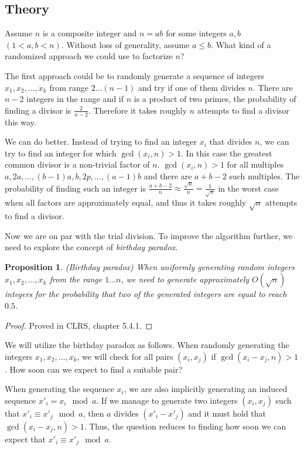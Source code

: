 \documentclass[12pt] {article}
\theoremstyle{plain}
\newtheorem{prop}[thm]{Proposition}
\theoremstyle{definition}
\begin{document}
\subsection {Theory}

Assume $n$ is a composite integer and $n = ab$ for some integers $a, b$ $(1 < a, b < n)$. Without loss of generality, assume $a \leq b$. What kind of a randomized approach we could use to factorize $n$?

The first approach could be to randomly generate a sequence of integers $x_1, x_2, \dots, x_k$ from range $2 \dots (n-1)$ and try if one of them divides $n$. There are $n-2$ integers in the range and if $n$ is a product of two primes, the probability of finding a divisor is $\frac{2}{n-2}$. Therefore it takes roughly $n$ attempts to find a divisor this way.

We can do better. Instead of trying to find an integer $x_i$ that divides $n$, we can try to find an integer for which $\gcd(x_i, n) > 1$. In this case the greatest common divisor is a non-trivial factor of $n$. $\gcd(x_i, n) > 1$ for all multiples $a, 2a, \dots, (b-1)a, b, 2p, \dots, (a-1)b$ and there are $a + b - 2$ such multiples. The probability of finding such an integer is $\frac{a+b-2}{n} \approx \frac{\sqrt{n}}{n} = \frac{1}{\sqrt{n}}$ in the worst case when all factors are approximately equal, and thus it takes roughly $\sqrt{n}$ attempts to find a divisor.

Now we are on par with the trial division. To improve the algorithm further, we need to explore the concept of \textit{birthday paradox}.

\begin{prop} (Birthday paradox)
\label {prop:birthdayparadox}
When uniformly generating random integers $x_1, x_2, \dots, x_k$ from the range $1 \dots n$, we need to generate approximately $O(\sqrt{n})$ integers for the probability that two of the generated integers are equal to reach $0.5$.
\end{prop}

\begin{proof}
Proved in CLRS\cite{clrs}, chapter 5.4.1.
\end{proof}

We will utilize the birthday paradox as follows. When randomly generating the integers $x_1, x_2, \dots, x_k$, we will check for all pairs $(x_i, x_j)$ if $\gcd(x_i - x_j, n) > 1$. How soon can we expect to find a suitable pair?

When generating the sequence $x_i$, we are also implicitly generating an induced sequence $x'_i = x_i \mod a$. If we manage to generate two integers $(x_i, x_j)$ such that $x'_i \equiv x'_j \mod a$, then $a$ divides $(x'_i-x'_j)$ and it must hold that $\gcd(x_i-x_j, n) > 1$. Thus, the question reduces to finding how soon we can expect that $x'_i \equiv x'_j \mod a$.
\end{document}
